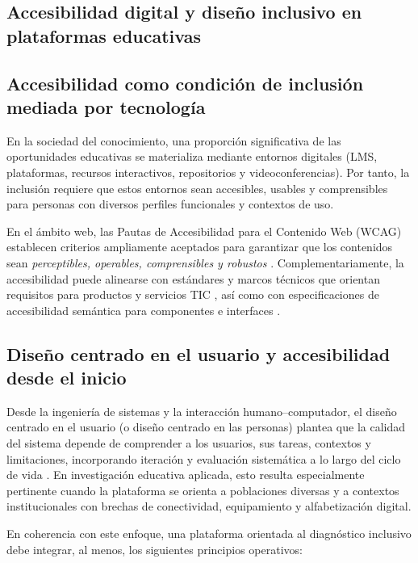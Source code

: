 \begin{refsection}
\section{Accesibilidad digital y diseño inclusivo en plataformas educativas}

\subsection{Accesibilidad como condición de inclusión mediada por tecnología}

En la sociedad del conocimiento, una proporción significativa de las oportunidades educativas se materializa mediante entornos digitales (LMS, plataformas, recursos interactivos, repositorios y videoconferencias). Por tanto, la inclusión requiere que estos entornos sean accesibles, usables y comprensibles para personas con diversos perfiles funcionales y contextos de uso.

En el ámbito web, las Pautas de Accesibilidad para el Contenido Web (WCAG) establecen criterios ampliamente aceptados para garantizar que los contenidos sean \textit{perceptibles, operables, comprensibles y robustos} \parencite{w3cwcag}. Complementariamente, la accesibilidad puede alinearse con estándares y marcos técnicos que orientan requisitos para productos y servicios TIC \parencite{etsi301549}, así como con especificaciones de accesibilidad semántica para componentes e interfaces \parencite{w3caria}.

\subsection{Diseño centrado en el usuario y accesibilidad desde el inicio}

Desde la ingeniería de sistemas y la interacción humano--computador, el diseño centrado en el usuario (o diseño centrado en las personas) plantea que la calidad del sistema depende de comprender a los usuarios, sus tareas, contextos y limitaciones, incorporando iteración y evaluación sistemática a lo largo del ciclo de vida \parencite{iso9241210}. En investigación educativa aplicada, esto resulta especialmente pertinente cuando la plataforma se orienta a poblaciones diversas y a contextos institucionales con brechas de conectividad, equipamiento y alfabetización digital.

En coherencia con este enfoque, una plataforma orientada al diagnóstico inclusivo debe integrar, al menos, los siguientes principios operativos:


\end{refsection}
